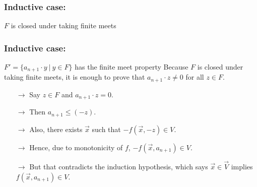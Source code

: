 \documentclass[10pt]{beamer}
\theoremstyle{definition}
\theoremstyle{definition}
\begin{document}
\begin{frame}\label{frame: inductive case, F is closed under finite meets}

\frametitle{Inductive case:}

\begin{block}{$F$ is closed under taking finite meets}
\begin{enumerate}
\end{enumerate}
\end{block}

\end{frame}

\begin{frame}\label{frame: inductive case, F has the finite meet property}

\frametitle{Inductive case:}

\begin{block}{$F' = \{ a_{n+1}\cdot y\ |\ y\in F\}$ has the finite meet property}
\pause
Because $F$ is closed under taking finite meets, it is enough to prove that
$a_{n+1}\cdot z \neq 0$ for all $z\in F$.\smallskip

\begin{enumerate}
\pause
\item[$\rightarrow$]Say $z\in F$ and $a_{n+1}\cdot z = 0$.
\pause
\item[$\rightarrow$]Then $a_{n+1} \leq (-z)$.
\pause
\item[$\rightarrow$]Also, there exists $\overrightarrow{x}$ such that 
$-f(\overrightarrow{x},-z) \in V$.
\pause
\item[$\rightarrow$]Hence, due to monotonicity of $f$, 
$-f(\overrightarrow{x},a_{n+1}) \in V.$
\pause
\item[$\rightarrow$]But that contradicts the induction hypothesis, which says 
$\overrightarrow{x}\in \overrightarrow{V}$ implies $f(\overrightarrow{x},a_{n+1}) \in V$.
\end{enumerate}
\end{block}
\end{frame}
\end{document}

